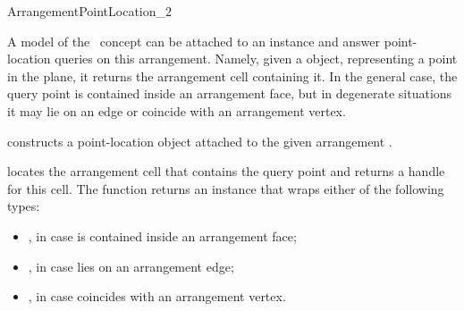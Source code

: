 
\ccRefPageBegin

\begin{ccRefConcept}{ArrangementPointLocation_2}

\ccDefinition

A model of the \ccRefName\ concept can be attached to an 
instance and answer point-location queries on this arrangement. Namely, given
a  object, representing a point in the plane,
it returns the arrangement cell containing it. In the general case, the
query point is contained inside an arrangement face, but in degenerate
situations it may lie on an edge or coincide with an arrangement vertex.

\ccTypes



\ccCreation
{}


  {constructs a point-location object \ccVar{} attached to the given
   arrangement .}

\ccQueryFunctions

  {locates the arrangement cell that contains the query point 
   and returns a handle for this cell.
   The function returns an  instance that wraps either of the
   following types:
   \begin{itemize}
   \item {}, in case  is
         contained inside an arrangement face;
   \item {}, in case  lies
         on an arrangement edge;
   \item {}, in case  coincides
         with an arrangement vertex.
   \end{itemize}
   }


\end{ccRefConcept}
